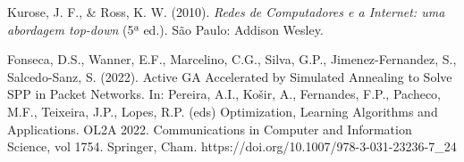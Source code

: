 \documentclass[conference]{IEEEtran}
\begin{document}
\begin{thebibliography}{00}
Kurose, J. F., \& Ross, K. W. (2010). \textit{Redes de Computadores e a Internet: uma abordagem top-down} (5ª ed.). São Paulo: Addison Wesley.

Fonseca, D.S., Wanner, E.F., Marcelino, C.G., Silva, G.P., Jimenez-Fernandez, S., Salcedo-Sanz, S. (2022). Active GA Accelerated by Simulated Annealing to Solve SPP in Packet Networks. In: Pereira, A.I., Košir, A., Fernandes, F.P., Pacheco, M.F., Teixeira, J.P., Lopes, R.P. (eds) Optimization, Learning Algorithms and Applications. OL2A 2022. Communications in Computer and Information Science, vol 1754. Springer, Cham. https://doi.org/10.1007/978-3-031-23236-7\_24
\end{thebibliography} 
\end{document}
